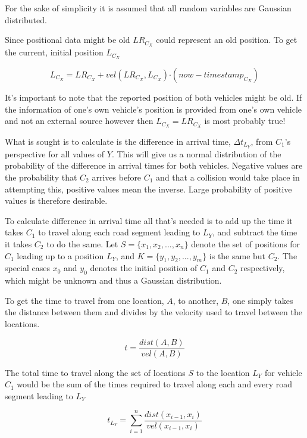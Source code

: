 \documentclass{article}
\begin{document}
			For the sake of simplicity it is assumed that all random variables are Gaussian distributed.

			Since positional data might be old $LR_{C_X}$ could represent an old position. To get the current, initial position $L_{C_X}$

			\begin{equation}
				L_{C_X} = LR_{C_X} +  vel(LR_{C_X}, L_{C_X}) \boldsymbol{\cdot} (now - timestamp_{C_X})
			\end{equation}

			It's important to note that the reported position of both vehicles might be old. If the information of one's own vehicle's position is provided from one's own vehicle and not an external source however then $L_{C_X} = LR_{C_X}$ is most probably true!

			What is sought is to calculate is the difference in arrival time, $\Delta{t}_{L_Y}$, from $C_1$'s perspective for all values of $Y$. This will give us a normal distribution of the probability of the difference in arrival times for both vehicles. Negative values are the probability that $C_2$ arrives before $C_1$ and that a collision would take place in attempting this, positive values mean the inverse. Large probability of positive values is therefore desirable.

			To calculate difference in arrival time all that's needed is to add up the time it takes $C_1$ to travel along each road segment leading to $L_Y$, and subtract the time it takes $C_2$ to do the same. Let $S = \{x_1,x_2,...,x_n\}$ denote the set of positions for $C_1$ leading up to a position $L_Y$, and $K = \{y_1,y_2,...,y_m\}$ is the same but $C_2$. The special cases $x_0$ and $y_0$ denotes the initial position of $C_1$ and $C_2$ respectively, which might be unknown and thus a Gaussian distribution.

			To get the time to travel from one location, $A$, to another, $B$, one simply takes the distance between them and divides by the velocity used to travel between the locations.

			\begin{equation}
				t = \frac{dist(A, B)}{vel(A, B)}
				\label{eq:simpleT}
			\end{equation}

			The total time to travel along the set of locations $S$ to the location $L_Y$ for vehicle $C_1$ would be the sum of the times required to travel along each and every road segment leading to $L_Y$

			\begin{equation}
				t_{L_Y} = \sum_{i=1}^{n} \frac{dist(x_{i-1}, x_i)}{vel(x_{i-1}, x_i)}
				\label{eq:sumT}
			\end{equation}
\end{document}
